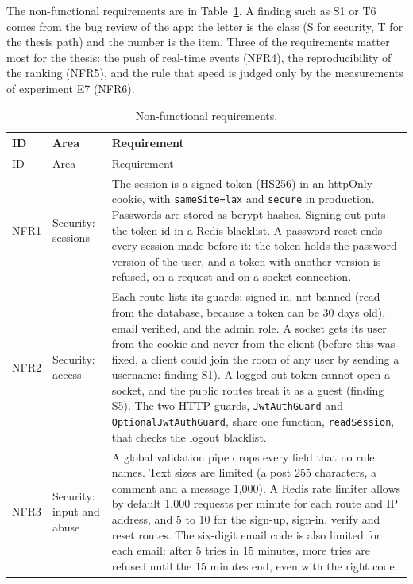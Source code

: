 The non-functional requirements are in Table~\ref{tab:design-nfr}. A finding such as S1 or T6 comes from the bug review of the app: the letter is the class (S for security, T for the thesis path) and the number is the item. Three of the requirements matter most for the thesis: the push of real-time events (NFR4), the reproducibility of the ranking (NFR5), and the rule that speed is judged only by the measurements of experiment E7 (NFR6).

{\small\singlespacing
\begin{longtable}{@{}>{\raggedright\arraybackslash}p{1.3cm} >{\raggedright\arraybackslash}p{2.9cm} >{\raggedright\arraybackslash}p{\dimexpr\textwidth-4.2cm-4\tabcolsep\relax}@{}}
  \caption{Non-functional requirements.}
  \label{tab:design-nfr}\\
  \toprule
  ID & Area & Requirement \\
  \midrule
  \endfirsthead
  \toprule
  ID & Area & Requirement \\
  \midrule
  \endhead
  \bottomrule
  \endlastfoot
  NFR1 & Security: sessions & The session is a signed token (HS256) in an httpOnly cookie, with \texttt{sameSite=lax} and \texttt{secure} in production. Passwords are stored as bcrypt hashes. Signing out puts the token id in a Redis blacklist. A password reset ends every session made before it: the token holds the password version of the user, and a token with another version is refused, on a request and on a socket connection. \\
  NFR2 & Security: access & Each route lists its guards: signed in, not banned (read from the database, because a token can be 30 days old), email verified, and the admin role. A socket gets its user from the cookie and never from the client (before this was fixed, a client could join the room of any user by sending a username: finding S1). A logged-out token cannot open a socket, and the public routes treat it as a guest (finding S5). The two HTTP guards, \texttt{JwtAuthGuard} and \texttt{OptionalJwtAuthGuard}, share one function, \texttt{readSession}, that checks the logout blacklist. \\
  NFR3 & Security: input and abuse & A global validation pipe drops every field that no rule names. Text sizes are limited (a post 255 characters, a comment and a message 1,000). A Redis rate limiter allows by default 1,000 requests per minute for each route and IP address, and 5 to 10 for the sign-up, sign-in, verify and reset routes. The six-digit email code is also limited for each email: after 5 tries in 15 minutes, more tries are refused until the 15 minutes end, even with the right code. \\

\end{longtable}}
